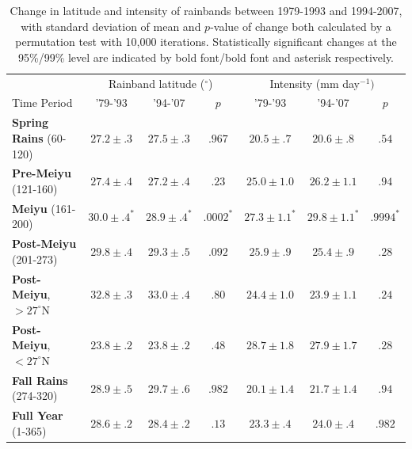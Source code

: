 \documentclass{ametsoc}
\begin{document}
\begin{table}

\centering

\caption{Change in latitude and intensity of rainbands between 1979-1993 and 1994-2007, with standard deviation of mean and $p$-value of change both calculated by a permutation test with 10,000 iterations. Statistically significant changes at the 95\%/99\% level are indicated by bold font/bold font and asterisk respectively.}

\begin{tabular}{ l c c c c c c}
	& \multicolumn{3}{c}{Rainband latitude ($^\circ$)} & \multicolumn{3}{c}{Intensity (mm day$^{-1})$} \\
	Time Period & '79-'93 & '94-'07 & $p$ & '79-'93 & '94-'07 & $p$ \\
	\hline	
	\textbf{Spring Rains} (60-120)		& $27.2 \pm .3 $ & $27.5 \pm .3 $ & $ .967 $ 	& $20.5 \pm .7$ 	& $20.6 \pm .8 	$ & $.54$ \\
	\textbf{Pre-Meiyu} (121-160) 		& $27.4 \pm .4 $ & $27.2 \pm .4$ & $ .23 $ 	& $25.0 \pm 1.0$ 	& $26.2 \pm 1.1	$ & $.94$ \\
	\textbf{Meiyu} (161-200)			& $\boldsymbol{30.0 \pm .4^*}$ & $\boldsymbol{28.9 \pm .4^*}$ & $\boldsymbol{.0002^*}$ & $\boldsymbol{27.3 \pm 1.1^*}$ 	& $\boldsymbol{29.8 \pm 1.1^*}$  & $\boldsymbol{.9994 ^*}$ \\
	\textbf{Post-Meiyu} (201-273)		& $29.8 \pm .4 $ & $29.3 \pm .5 $ & $ .092 $	& $25.9 \pm .9$ 	& $25.4 \pm .9	$ & $.28$ \\
	\textbf{Post-Meiyu}, $>27^\circ$N 	& $32.8 \pm .3 $ & $33.0 \pm .4 $ & $ .80 $ 	& $24.4 \pm 1.0$ 	& $23.9 \pm 1.1	$ & $.24$ \\
	\textbf{Post-Meiyu}, $<27^\circ$N 	& $23.8 \pm .2 $ & $23.8 \pm .2 $ & $ .48 $ 	& $28.7 \pm 1.8$ 	& $27.9 \pm 1.7	$ & $.28$  \\
	\textbf{Fall Rains} (274-320)			& $\boldsymbol{28.9 \pm .5} $ & $\boldsymbol{29.7 \pm .6} $ & $ \boldsymbol{.982} $ 	& $20.1 \pm 1.4$ 	& $21.7 \pm 1.4	$ & $.94$ \\
	\textbf{Full Year} (1-365)			& $28.6 \pm .2 $ & $28.4 \pm .2 $ & $ .13 $ 	& $\boldsymbol{23.3 \pm .4}$ 	& $\boldsymbol{24.0 \pm .4}	$ & $\boldsymbol{.982}$ \\

\end{tabular}
\label{tab:t38}
\end{table}
\end{document}
